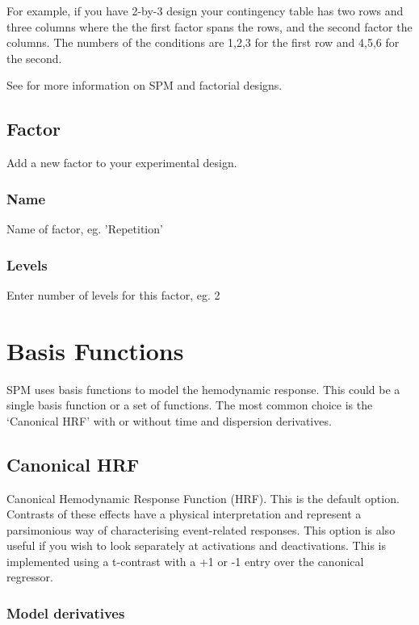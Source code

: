 For example, if you have 2-by-3 design  your contingency table has two rows and three columns where the the first factor spans the rows, and the second factor the columns. The numbers of the conditions are 1,2,3 for the first row and 4,5,6 for the second.

See \cite{rnah_anova} for more information on SPM and factorial designs.

\subsection{Factor}

Add a new factor to your experimental design.

\subsubsection{Name}

Name of factor, eg. 'Repetition' 

\subsubsection{Levels}

Enter number of levels for this factor, eg. 2

\section{Basis Functions}

SPM uses basis functions to model the hemodynamic response. This could be a single basis function or a set of functions. The most common choice is the `Canonical HRF' with or without time and dispersion derivatives. 

\subsection{Canonical HRF}

Canonical Hemodynamic Response Function (HRF). This is the default option. Contrasts of these effects have a physical interpretation and represent a parsimonious way of characterising event-related responses. This option is also useful if you wish to look separately at activations and deactivations. This is implemented using a t-contrast with a +1 or -1 entry over the canonical regressor. 

\subsubsection{Model derivatives}


